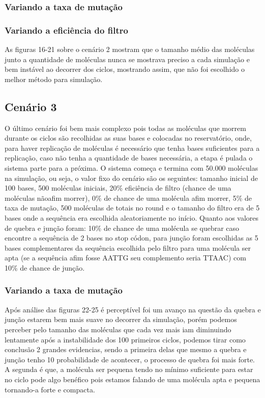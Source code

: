 \subsubsection{Variando a taxa de mutação}


\subsubsection{Variando a eficiência do filtro}


As figuras 16-21 sobre o cenário 2 mostram que o tamanho médio das moléculas
junto a quantidade de moléculas nunca se mostrava preciso a cada simulação e bem
instável ao decorrer dos ciclos, mostrando assim, que não foi escolhido o melhor método
para simulação.

\subsection{Cenário 3}

O último cenário foi bem mais complexo pois todas as moléculas que morrem
durante os ciclos são recolhidas as suas bases e colocadas no reservatório, onde, para
haver replicação de moléculas é necessário que tenha bases suficientes para a
replicação, caso não tenha a quantidade de bases necessária, a etapa é pulada o sistema
parte para a próxima. O sistema começa e termina com 50.000 moléculas na
simulação, ou seja, o valor fixo do cenário são os seguintes: tamanho inicial de 100
bases, 500 moléculas iniciais, 20\% eficiência de filtro (chance de uma moléculas nãoafim morrer), 0\% de chance de uma molécula afim morrer, 5\% de taxa de mutação,
500 moléculas de totais no round e o tamanho do filtro era de 5 bases onde a sequência
era escolhida aleatoriamente no início. Quanto aos valores de quebra e junção foram:
10\% de chance de uma molécula se quebrar caso encontre a sequência de 2 bases no
stop códon, para junção foram escolhidas as 5 bases complementares da sequência
escolhida pelo filtro para uma molécula ser apta (se a sequência afim fosse AATTG
seu complemento seria TTAAC) com 10\% de chance de junção.

\subsubsection{Variando a taxa de mutação}


Após análise das figuras 22-25 é perceptível foi um avanço na questão da quebra
e junção estarem bem mais suave no decorrer da simulação, porém podemos perceber
pelo tamanho das moléculas que cada vez mais iam diminuindo lentamente após a
instabilidade dos 100 primeiros ciclos, podemos tirar como conclusão 2 grandes
evidencias, sendo a primeira delas que mesmo a quebra e junção tenho 10%
probabilidade de acontecer, o processo de quebra foi mais forte. A segunda é que, a
molécula ser pequena tendo no mínimo suficiente para estar no ciclo pode algo benéfico
pois estamos falando de uma molécula apta e pequena tornando-a forte e compacta.


